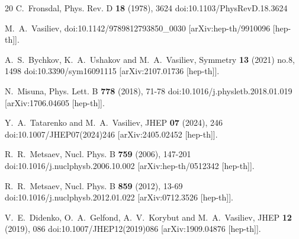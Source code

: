 \documentclass[12pt]{article}
\begin{document}
\begin{thebibliography}{20}
C.~Fronsdal,
Phys. Rev. D \textbf{18} (1978), 3624
doi:10.1103/PhysRevD.18.3624

M.~A.~Vasiliev,
doi:10.1142/9789812793850{\_}0030
[arXiv:hep-th/9910096 [hep-th]].

A.~S.~Bychkov, K.~A.~Ushakov and M.~A.~Vasiliev,
Symmetry \textbf{13} (2021) no.8, 1498
doi:10.3390/sym16091115
[arXiv:2107.01736 [hep-th]].

N.~Misuna,
Phys. Lett. B \textbf{778} (2018), 71-78
doi:10.1016/j.physletb.2018.01.019
[arXiv:1706.04605 [hep-th]].

Y.~A.~Tatarenko and M.~A.~Vasiliev,
JHEP \textbf{07} (2024), 246
doi:10.1007/JHEP07(2024)246
[arXiv:2405.02452 [hep-th]].

R.~R.~Metsaev,
Nucl. Phys. B \textbf{759} (2006), 147-201
doi:10.1016/j.nuclphysb.2006.10.002
[arXiv:hep-th/0512342 [hep-th]].

R.~R.~Metsaev,
Nucl. Phys. B \textbf{859} (2012), 13-69
doi:10.1016/j.nuclphysb.2012.01.022
[arXiv:0712.3526 [hep-th]].

V.~E.~Didenko, O.~A.~Gelfond, A.~V.~Korybut and M.~A.~Vasiliev,
JHEP \textbf{12} (2019), 086
doi:10.1007/JHEP12(2019)086
[arXiv:1909.04876 [hep-th]].


\end{thebibliography}
\end{document}
